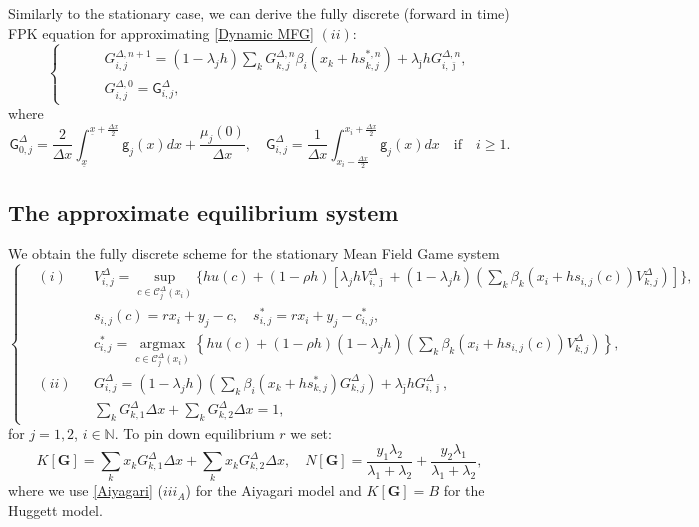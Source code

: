 \documentclass[11pt]{article}
\numberwithin{equation}{section}
\theoremstyle{Claim}
\newcommand{\N}{\mathbb{N}}
\newcommand{\mC}{\mathcal C}
\def\bG{{\mathbf{G}}}
\def\bjm{{\bar{\jmath}}}
\newcommand{\ux}{{\underline x}}
\newcommand{\ox}{\overline x}
\theoremstyle{plain}
\newcommand{\D}{\Delta}
\begin{document}
Similarly to the stationary case, we can derive the fully discrete (forward in time) FPK equation for approximating \eqref{Dynamic MFG} $(ii)$:
\begin{equation}\label{eq:FPhD}
\left\{\begin{aligned}
\qquad &G^{\D,n+1}_{i,j}=(1-\lambda_jh)\sum_k G^{\D,n}_{k,j}\beta_i(x_k+hs_{k,j}^{*,n})+\lambda_{\bar \jmath}hG^{\D,n}_{i,\bjm},\\
&G^{\D,0}_{i,j}=\mathsf{G}^{\D}_{i,j},
\end{aligned}\right.
\end{equation}
where
$$
\mathsf{G}^\D_{0,j}=\frac{2}{\D x}\int_{\ux}^{\ux+\frac{\D x}{2}}\mathsf{g}_j(x)dx+\frac{\mu_j(0)}{\D x},\quad \mathsf{G}^\D_{i,j}=\frac{1}{\D x}\int_{x_i-\frac{\D x}{2}}^{x_i+\frac{\D x}{2}}\mathsf{g}_j(x)dx\quad \text{if}\quad i\geq 1.
$$
\subsection{The approximate equilibrium system}
We obtain the fully discrete scheme for the stationary Mean Field Game system
\begin{equation}\label{eq:fully_discrete_scheme}
\left\{\begin{aligned}
&(i)&&		V^{\D}_{i,j}=\sup_{c\in \mC^{\D}_{j}(x_i)}\Biggl\{
		hu(c)
		+(1-\rho h)\left[\lambda_j hV^{\D}_{i,\bjm} 
		+(1-\lambda_jh)\left(\sum_k \beta_k(x_i+hs_{i,j}(c))V^{\D}_{k,j}\right)\right]
		\Biggl\},\\[6pt]
&&& s_{i,j}(c)=rx_i+y_j-c,\quad s^*_{i,j}=rx_i+y_j-c^*_{i,j},\\
&&& c^*_{i,j}=\mathop{\arg\max}\limits_{c\in \mC^{\D}_{j}(x_i)}\left\{
		hu(c)+(1-\rho h)(1-\lambda_jh)\left(\sum_k \beta_k(x_i+hs_{i,j}(c))V^{\D}_{k,j}\right)\right\},\\[6pt]	
&(ii) &&		G^{\D}_{i,j}=(1-\lambda_jh) \left( \sum_k \beta_i\left(x_k+hs^*_{k,j}\right) G^{\D}_{k,j}\right) +\lambda_{\bar \jmath}hG^{\D}_{i,\bjm},\\
&&&\sum_k G^{\D}_{k,1}\D x+\sum_k G^{\D}_{k,2}\D x=1,
\end{aligned}\right.
\end{equation}
for $j=1,2$, $i\in\N$. To pin down equilibrium $r$ we set:
$$
K[\bG]=\sum_k x_k G^{\D}_{k,1}\D x+\sum_k x_k G^{\D}_{k,2}\D x,\quad N[\bG]=\frac{y_1\lambda_2}{\lambda_1+\lambda_2}+\frac{y_2\lambda_1}{\lambda_1+\lambda_2},
$$
where we use \eqref{Aiyagari} ($iii_A$) for the Aiyagari model and $K[\bG]=B$ for the Huggett model.
\end{document}
